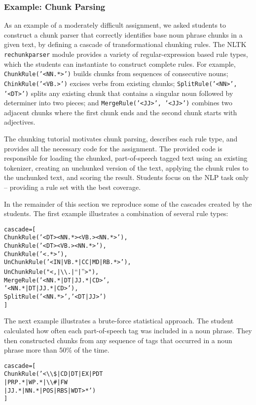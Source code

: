 \documentclass[11pt]{article}
\newenvironment{sv}{\small\begin{alltt}}{\end{alltt}\normalsize}
\begin{document}
\subsubsection*{Example: Chunk Parsing}

As an example of a moderately difficult assignment, we asked students
to construct a chunk parser that correctly identifies base noun phrase
chunks in a given text, by defining a cascade of transformational
chunking rules.  The NLTK \texttt{rechunkparser} module provides a
variety of regular-expression based rule types, which the students can
instantiate to construct complete rules.  For example,
\texttt{ChunkRule('<NN.*>')} builds chunks from sequences of
consecutive nouns; \texttt{ChinkRule('<VB.>')} excises verbs from
existing chunks; \texttt{SplitRule('<NN>', '<DT>')} splits any
existing chunk that contains a singular noun followed by determiner
into two pieces; and \texttt{MergeRule('<JJ>', '<JJ>')} combines two
adjacent chunks where the first chunk ends and the second chunk starts
with adjectives.

The chunking tutorial motivates chunk parsing, describes each rule
type, and provides all the necessary code for the assignment.  The
provided code is responsible for loading the chunked, part-of-speech
tagged text using an existing tokenizer, creating an unchunked version
of the text, applying the chunk rules to the unchunked text, and
scoring the result.  Students focus on the NLP task only -- providing
a rule set with the best coverage.

In the remainder of this section we reproduce some of the cascades
created by the students.  The first example illustrates a combination
of several rule types:

\begin{sv}
cascade = [
  ChunkRule('<DT><NN.*><VB.><NN.*>'),
  ChunkRule('<DT><VB.><NN.*>'),
  ChunkRule('<.*>'),
  UnChunkRule('<IN|VB.*|CC|MD|RB.*>'),
  UnChunkRule("<,|{\textbackslash}{\textbackslash}.|``|''>"),
  MergeRule('<NN.*|DT|JJ.*|CD>',
            '<NN.*|DT|JJ.*|CD>'),
  SplitRule('<NN.*>', '<DT|JJ>')
]
\end{sv}

The next example illustrates a brute-force statistical approach.  The
student calculated how often each part-of-speech tag was included in a
noun phrase.  They then constructed chunks from any sequence of tags
that occurred in a noun phrase more than 50\% of the time.

\begin{sv}
cascade = [
  ChunkRule('<{\textbackslash}{\textbackslash}\$|CD|DT|EX|PDT
             |PRP.*|WP.*|{\textbackslash}{\textbackslash}\#|FW
             |JJ.*|NN.*|POS|RBS|WDT>*')
]
\end{sv}
\end{document}
